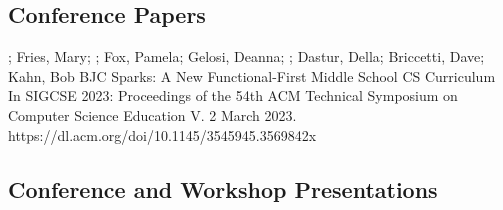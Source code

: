 \subsection{Conference Papers}
\vspace{5pt}
\begin{etaremune}
    \setlength\itemsep{1em}
    \item{\dan; Fries, Mary; \me; Fox, Pamela;  Gelosi, Deanna; \lauren; Dastur, Della; Briccetti, Dave; Kahn, Bob
    \newline 
    BJC Sparks: A New Functional-First Middle School CS Curriculum
    \newline In SIGCSE 2023: Proceedings of the 54th ACM Technical Symposium on Computer Science Education V. 2 March 2023.
    \newline
    https://dl.acm.org/doi/10.1145/3545945.3569842x}
\end{etaremune}

\subsection{Conference and Workshop Presentations}
\vspace{5pt}

\newcommand{\sigcsePDX}[1]{\newline In SIGCSE 2024: Proceedings of the 55th ACM Technical Symposium on Computer Science Education V. 2 March 2024\newline \href{#1}{#1}}

\newcommand{\sigcseYYZ}[1]{\newline In SIGCSE 2023: Proceedings of the 54th ACM Technical Symposium on Computer Science Education V. 2 March 2023.\newline \href{#1}{#1}}

\newcommand{\sigcsePVD}[4]{\item{#1\newline #2 (#3). \newline In SIGCSE 2022: Proceedings of the 53th ACM Technical Symposium on Computer Science Education V. 2 March 2022.\newline \href{#4}{#4}}}

